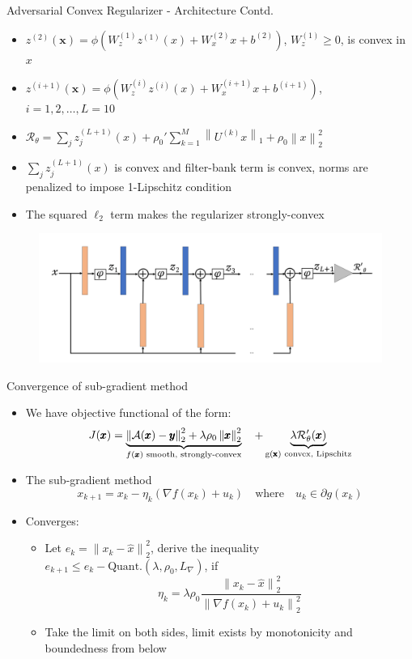 \documentclass{beamer}
\newcommand{\norm}[1]{\left\lVert#1\right\rVert}
\begin{document}
\begin{frame}{Adversarial Convex Regularizer - Architecture Contd.}
\begin{itemize}
\item $z^{(2)}(\pmb{x}) = \phi \left( W_{z}^{(1)}z^{(1)}(x) + W_{x}^{(2)}x + b^{(2)}  \right)$, $W_{z}^{(1)} \geq 0$, is convex in $x$
\item $z^{(i+1)}(\pmb{x}) = \phi \left( W_{z}^{(i)}z^{(i)}(x) + W_{x}^{(i+1)}x + b^{(i+1)}  \right)$, $i = 1, 2, \dots, L = 10$
\item $\mathcal{R}_{\theta} = \sum_{j} z_{j}^{(L+1)}(x) + \rho_{0}' \sum_{k=1}^{M} \norm{U^{(k)}x}_{1} + \rho_{0} \norm{x}_{2}^{2}$
\item $\sum_{j} z_{j}^{(L+1)}(x)$ is convex and filter-bank term is convex, norms are penalized to impose 1-Lipschitz condition
\item The squared $\ell_{2}$ term makes the regularizer strongly-convex
\end{itemize}
\begin{center}
\begin{figure}
\includegraphics[width=.6\textwidth]{../figures/arhitecture.png}
\end{figure}
\end{center}
\end{frame}

\begin{frame}{Convergence of sub-gradient method}
\begin{itemize}
\item We have objective functional of the form:
$$
J(\pmb{x}) = \underbrace{\norm{\mathcal{A}(\pmb{x}) - \pmb{y}}_{2}^{2} + \lambda \rho_0 \norm{\pmb{x}}_{2}^{2}}_\text{$f(\pmb{x})$ smooth, strongly-convex} \quad
+ \underbrace{\lambda \mathcal{R}_{\theta}'(\pmb{x})}_\text{g(\pmb{x}) convex, Lipschitz}
$$
\item The sub-gradient method 
$$
x_{k+1} = x_{k} - \eta_{k} \left(\nabla f(x_k) + u_k\right) 
\quad \text{where} \quad u_k \in \partial g(x_k)
$$
\item Converges: 
\begin{itemize}
\item Let $e_{k} = \norm{x_k - \hat{x}}_{2}^{2}$, derive the inequality $e_{k+1} \leq e_{k} - \text{Quant.}(\lambda, \rho_0, L_{\nabla})$, if
$$
\eta_{k} = \lambda \rho_{0} \frac{\norm{x_{k} - \hat{x}}_{2}^{2}}{\norm{\nabla f(x_{k}) + u_{k}}_{2}^{2}}
$$
\item Take the limit on both sides, limit exists by monotonicity and boundedness from below
\end{itemize}
\end{itemize}
\end{frame}
\end{document}

